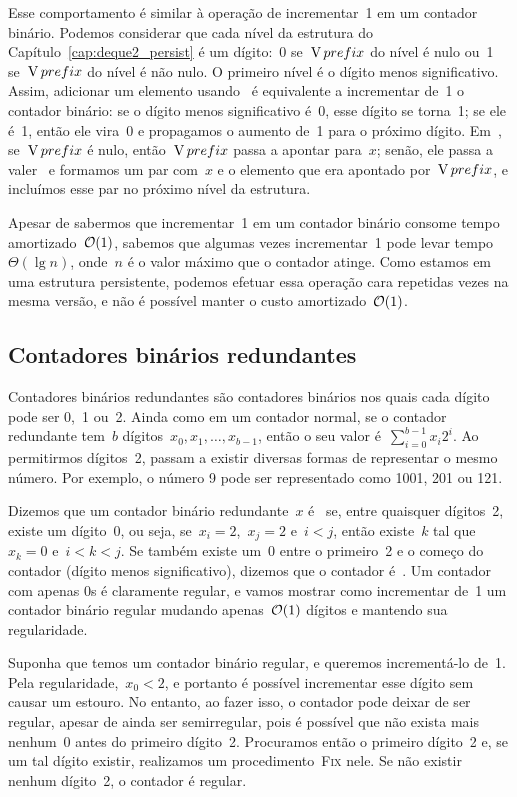 \documentclass[main.tex]{subfiles}
\begin{document}
Esse comportamento é similar à operação de incrementar~1 em um contador binário. Podemos considerar que cada nível da estrutura do Capítulo~\ref{cap:deque2_persist} é um dígito:~0 se~$\operatorname{V}{prefix}$ do nível é nulo ou~1 se~$\operatorname{V}{prefix}$ do nível é não nulo. O primeiro nível é o dígito menos significativo. Assim, adicionar um elemento usando~ é equivalente a incrementar de~1 o contador binário:
se o dígito menos significativo é~0, esse dígito se torna~1; se ele é~1, então ele vira~0 e propagamos o aumento de~1 para o próximo dígito. Em~, se~$\operatorname{V}{prefix}$ é nulo, então~$\operatorname{V}{prefix}$ passa a apontar para~$x$; senão, ele passa a valer~ e formamos um par com~$x$ e o elemento que era apontado por~$\operatorname{V}{prefix}$, e incluímos esse par no próximo nível da estrutura.

Apesar de sabermos que incrementar~1 em um contador binário consome tempo amortizado~$\mathcal{O}(1)$, sabemos que algumas vezes incrementar~1 pode levar tempo~$\Theta(\lg n)$, onde~$n$ é o valor máximo que o contador atinge. Como estamos em uma estrutura persistente, podemos efetuar essa operação cara repetidas vezes na mesma versão, e não é possível manter o custo amortizado~$\mathcal{O}(1)$.

\subsection{Contadores binários redundantes} \label{subsec:contbin_redun}

Contadores binários redundantes são contadores binários nos quais cada dígito pode ser 0,~1 ou~2. Ainda como em um contador normal, se o contador redundante tem~$b$ dígitos~$x_0, x_1, \ldots, x_{b-1}$, então o seu valor é~$\sum\limits_{i=0}^{b-1}{x_i 2^i}$. Ao permitirmos dígitos~2, passam a existir diversas formas de representar o mesmo número. Por exemplo, o número 9 pode ser representado como 1001, 201 ou 121.

Dizemos que um contador binário redundante~$x$ é~ se, entre quaisquer dígitos~2, existe um dígito~0, ou seja, se~${x_i = 2}$,~${x_j = 2}$ e~$i < j$, então existe~$k$ tal que~${x_k = 0}$ e~${i < k < j}$. Se também existe um~0 entre o primeiro~2 e o começo do contador (dígito menos significativo), dizemos que o contador é~. Um contador com apenas 0s é claramente regular, e vamos mostrar como incrementar de~1 um contador binário regular mudando apenas~$\mathcal{O}(1)$ dígitos e mantendo sua regularidade.

Suponha que temos um contador binário regular, e queremos incrementá-lo de~1. Pela regularidade,~${x_0 < 2}$, e portanto é possível incrementar esse dígito sem causar um estouro. No entanto, ao fazer isso, o contador pode deixar de ser regular, apesar de ainda ser semirregular, pois é possível que não exista mais nenhum~0 antes do primeiro dígito~2. Procuramos então o primeiro dígito~2 e, se um tal dígito existir, realizamos um procedimento~\textsc{Fix} nele. Se não existir nenhum dígito~2, o contador é regular.
\end{document}
